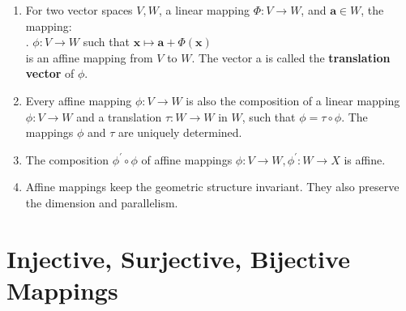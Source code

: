 \begin{enumerate}
    \item
    \begin{definition}
        For two vector spaces $V, W$, a linear mapping $\Phi : V \to W$, and $\bm{a} \in W$, the mapping:
        \hfill \cite{mfml/book/mml/Deisenroth-Faisal-Ong}
        \\
        .\hfill
        $ \phi : V \to W $ such that $ \bm{x} \mapsto \bm{a} + \Phi(\bm{x}) $
        \hfill \cite{mfml/book/mml/Deisenroth-Faisal-Ong}
        \\
        is an affine mapping from $V$ to $W$. 
        The vector a is called the \textbf{translation vector} of $\phi$.
        \hfill \cite{mfml/book/mml/Deisenroth-Faisal-Ong}
    \end{definition}

    \item Every affine mapping $\phi  : V \to W$ is also the composition of a linear mapping $\phi  : V \to W$ and a translation $\tau : W \to W$ in $W$, such that $\phi  = \tau \circ \phi $. 
    The mappings $\phi $ and $\tau$ are uniquely determined.
    \hfill \cite{mfml/book/mml/Deisenroth-Faisal-Ong}

    \item The composition $\phi ^\prime \circ \phi $ of affine mappings $\phi  : V \to W, \phi ^\prime: W \to X$ is affine.
    \hfill \cite{mfml/book/mml/Deisenroth-Faisal-Ong}

    \item Affine mappings keep the geometric structure invariant. 
    They also preserve the dimension and parallelism.
    \hfill \cite{mfml/book/mml/Deisenroth-Faisal-Ong}
\end{enumerate}



























\section{Injective, Surjective, Bijective Mappings}

